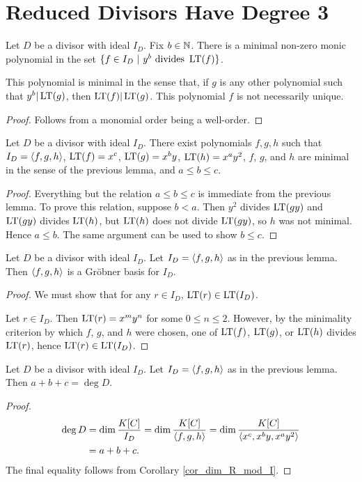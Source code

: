 \section{Reduced Divisors Have Degree 3}
\label{appendix_reduced_divisors}

\begin{lemma}
  Let $D$ be a divisor with ideal $I_D$.
  Fix $b \in \mathbb{N}$.
  There is a minimal non-zero monic polynomial in the set $\{ f \in I_D ~|~ y^b \text{ divides } \operatorname{LT}(f)\}$.
\end{lemma}
This polynomial is minimal in the sense that, if $g$ is any other polynomial such that $y^b|\operatorname{LT}(g)$,
then $\operatorname{LT}(f)|\operatorname{LT}(g)$.
This polynomial $f$ is not necessarily unique.
\begin{proof}
  Follows from a monomial order being a well-order.
\end{proof}

\begin{lemma}
  Let $D$ be a divisor with ideal $I_D$.
  There exist polynomials $f, g, h$ such that $I_D = \left\langle f, g, h \right\rangle$,
  $\operatorname{LT}(f) = x^c$,
  $\operatorname{LT}(g) = x^by$,
  $\operatorname{LT}(h) = x^ay^2$,
  $f$, $g$, and $h$ are minimal in the sense of the previous lemma,
  and $a \leq b \leq c$.
\end{lemma}
\begin{proof}
  Everything but the relation $a \leq b \leq c$ is immediate from the previous lemma.
  To prove this relation, suppose $b < a$.
  Then $y^2$ divides $\operatorname{LT}(gy)$ and $\operatorname{LT}(gy)$ divides $\operatorname{LT}(h)$, but $\operatorname{LT}(h)$ does not divide $\operatorname{LT}(gy)$,
  so $h$ was not minimal. Hence $a \leq b$.
  The same argument can be used to show $b \leq c$.
\end{proof}

\begin{lemma}
  Let $D$ be a divisor with ideal $I_D$.
  Let $I_D = \left\langle f, g, h \right\rangle$ as in the previous lemma.
  Then $\left\langle f, g, h \right\rangle$ is a Gr\"obner basis for $I_D$.
\end{lemma}
\begin{proof}
  We must show that for any $r \in I_D$, $\operatorname{LT}(r) \in \operatorname{LT}(I_D)$.
  
  Let $r \in I_D$. Then $\operatorname{LT}(r) = x^my^n$ for some $0 \leq n \leq 2$.
  However, by the minimality criterion by which $f$, $g$, and $h$ were chosen,
  one of $\operatorname{LT}(f)$, $\operatorname{LT}(g)$, or $\operatorname{LT}(h)$ divides $\operatorname{LT}(r)$, hence $\operatorname{LT}(r) \in \operatorname{LT}(I_D)$.
\end{proof}

\begin{lemma}
  Let $D$ be a divisor with ideal $I_D$.
  Let $I_D = \left\langle f, g, h \right\rangle$ as in the previous lemma.
  Then $a + b + c = \deg D$.
\end{lemma}
\begin{proof}
  \begin{align*}
  \deg D &= \dim \frac {K[C]}{I_D} = \dim \frac {K[C]}{\left\langle f,g,h \right\rangle}
          = \dim \frac {K[C]}{\left\langle x^c, x^by, x^ay^2 \right\rangle} \\
         &= a + b + c.
  \end{align*}
  The final equality follows from Corollary \ref{cor_dim_R_mod_I}.
\end{proof}

